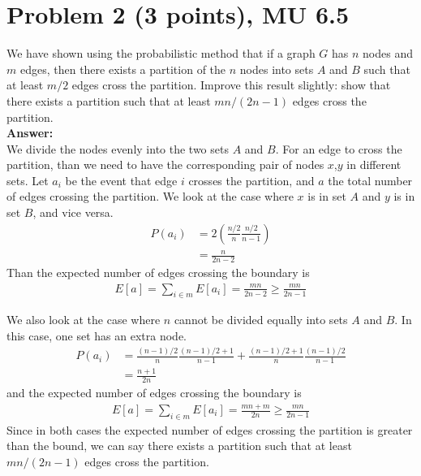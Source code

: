 \documentclass[letterpaper, 11pt]{article}
\begin{document}
\section*{Problem 2 (3 points), MU 6.5}
We have shown using the probabilistic method that if a graph $G$ has $n$ nodes and $m$ edges, then there exists a partition of the $n$ nodes into sets $A$ and $B$ such that at least $m/2$ edges cross the partition. Improve this result slightly: show that there exists a partition such that at least $mn/(2n-1)$ edges cross the partition. \\
\textbf{Answer:} \\
We divide the nodes evenly into the two sets $A$ and $B$. For an edge to cross the partition, than we need to have the corresponding pair of nodes $x$,$y$ in different sets. Let $a_i$ be the event that edge $i$ crosses the partition, and $a$ the total number of edges crossing the partition. We look at the case where $x$ is in set $A$ and $y$ is in set $B$, and vice versa.
\begin{align}
	P(a_i) &= 2\left(\frac{n/2}{n} \frac{n/2}{n-1}\right) \\
	&= \frac{n}{2n - 2}
\end{align}
Than the expected number of edges crossing the boundary is
\begin{align}
E[a] = \sum_{i \in m} E[a_i] = \frac{mn}{2n-2} \geq \frac{mn}{2n-1}
\end{align}

We also look at the case where $n$ cannot be divided equally into sets $A$ and $B$. In this case, one set has an extra node.
\begin{align}
P(a_i) &= \frac{(n-1)/2}{n}\frac{(n-1)/2 + 1}{n-1} + \frac{(n-1)/2 + 1}{n}\frac{(n-1)/2}{n-1} \\
&= \frac{n+1}{2n}
\end{align}
and the expected number of edges crossing the boundary is
\begin{align}
E[a] = \sum_{i \in m} E[a_i] = \frac{mn + m}{2n} \geq \frac{mn}{2n-1}
\end{align}
Since in both cases the expected number of edges crossing the partition is greater than the bound, we can say there exists a partition such that at least $mn/(2n-1)$ edges cross the partition.

\pagebreak
\end{document}
